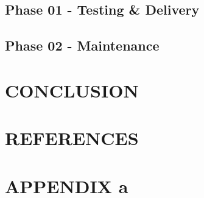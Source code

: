 \documentclass[letterpaper,12pt,2p]{elsarticle}
\begin{document}
\subsection{Phase 01 - Testing \& Delivery}
\label{subsec1}




\subsection{Phase 02 - Maintenance}
\label{subsec1}



\newpage 

\section{CONCLUSION}
\label{subsec1}


\newpage 

\section{REFERENCES}
\label{subsec1}


\newpage 


\section{APPENDIX a}
\label{subsec1}









\end{document}
